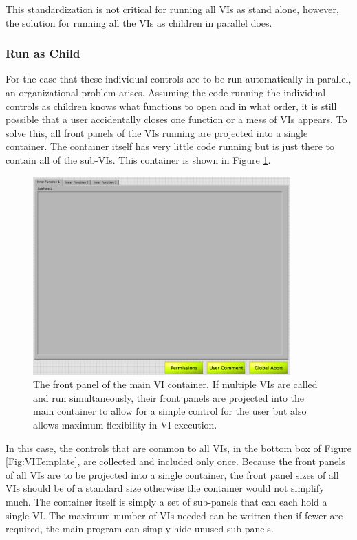 This standardization is not critical for running all VIs as stand alone, however, the solution for running all the VIs as children in parallel does. 

\subsubsection{Run as Child}

For the case that these individual controls are to be run automatically in parallel, an organizational problem arises. Assuming the code running the individual controls as children knows what functions to open and in what order, it is still possible that a user accidentally closes one function or a mess of VIs appears. To solve this, all front panels of the VIs running are projected into a single container. The container itself has very little code running but is just there to contain all of the sub-VIs. This container is shown in Figure \ref{Fig:VIContainer}.

\begin{figure}[!h]\centering
\includegraphics[height=3in]{Figures/MainVIContainer}
\caption{The front panel of the main VI container. If multiple VIs are called and run simultaneously, their front panels are projected into the main container to allow for a simple control for the user but also allows maximum flexibility in VI execution.}\label{Fig:VIContainer}
\end{figure}

In this case, the controls that are common to all VIs, in the bottom box of Figure \ref{Fig:VITemplate}, are collected and included only once. Because the front panels of all VIs are to be projected into a single container, the front panel sizes of all VIs should be of a standard size otherwise the container would not simplify much. The container itself  is simply a set of sub-panels that can each hold a single VI. The maximum number of VIs needed can be written then if fewer are required, the main program can simply hide unused sub-panels. 


